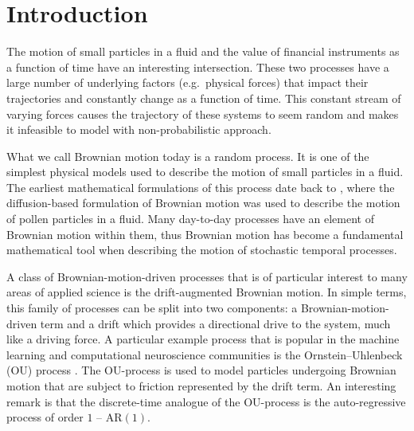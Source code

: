 \documentclass[a4paper,12pt,twoside,openright]{report}
\theoremstyle{definition}
\begin{document}
\pagestyle{empty}
\singlespacing

\onehalfspacing


\singlespacing


\setcounter{page}{0}
\pagestyle{plain}
\tableofcontents
\listoffigures
\listoftables
\onehalfspacing


 \chapter{Introduction}
 
 The motion of small particles in a fluid and the value of financial instruments as a function of time have an interesting intersection. These two processes have a large number of underlying factors (e.g.\ physical forces) that impact their trajectories and constantly change as a function of time. This constant stream of varying forces causes the trajectory of these systems to seem random and makes it infeasible to model with non-probabilistic approach. 
 
 What we call Brownian motion today is a random process. It is one of the simplest physical models used to describe the motion of small particles in a fluid. The earliest mathematical formulations of this process date back to \cite{einstein1905motion}, where the diffusion-based formulation of Brownian motion was used to describe the motion of pollen particles in a fluid. Many day-to-day processes have an element of Brownian motion within them, thus Brownian motion has become a fundamental mathematical tool when describing the motion of stochastic temporal processes.
 
 A class of Brownian-motion-driven processes that is of particular interest to many areas of applied science is the drift-augmented Brownian motion. In simple terms, this family of processes can be split into two components: a Brownian-motion-driven term and a drift which provides a directional drive to the system, much like a driving force. A particular example process that is popular in the machine learning and computational neuroscience communities is the Ornstein–Uhlenbeck (OU) process \citep{doob1942brownian}. The OU-process is used to model particles undergoing Brownian motion that are subject to friction represented by the drift term. An interesting remark is that the discrete-time analogue of the OU-process is the auto-regressive process of order $1$ -- $\text{AR}(1)$.
 
\end{document}
